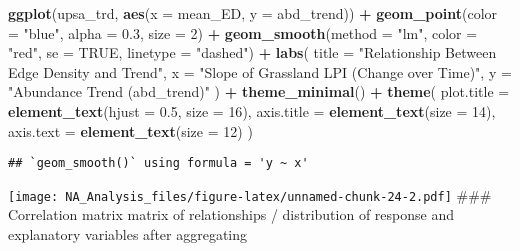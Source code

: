 \documentclass[
]{article}
\newenvironment{Shaded}{\begin{snugshade}}{\end{snugshade}}
\newcommand{\AttributeTok}[1]{\textcolor[rgb]{0.13,0.29,0.53}{#1}}
\newcommand{\ConstantTok}[1]{\textcolor[rgb]{0.56,0.35,0.01}{#1}}
\newcommand{\DecValTok}[1]{\textcolor[rgb]{0.00,0.00,0.81}{#1}}
\newcommand{\FloatTok}[1]{\textcolor[rgb]{0.00,0.00,0.81}{#1}}
\newcommand{\FunctionTok}[1]{\textcolor[rgb]{0.13,0.29,0.53}{\textbf{#1}}}
\newcommand{\NormalTok}[1]{#1}
\newcommand{\SpecialCharTok}[1]{\textcolor[rgb]{0.81,0.36,0.00}{\textbf{#1}}}
\newcommand{\StringTok}[1]{\textcolor[rgb]{0.31,0.60,0.02}{#1}}
\begin{document}
\begin{Shaded}
\begin{Highlighting}[]
\FunctionTok{ggplot}\NormalTok{(upsa\_trd, }\FunctionTok{aes}\NormalTok{(}\AttributeTok{x =}\NormalTok{ mean\_ED, }\AttributeTok{y =}\NormalTok{ abd\_trend)) }\SpecialCharTok{+}
  \FunctionTok{geom\_point}\NormalTok{(}\AttributeTok{color =} \StringTok{"blue"}\NormalTok{, }\AttributeTok{alpha =} \FloatTok{0.3}\NormalTok{, }\AttributeTok{size =} \DecValTok{2}\NormalTok{) }\SpecialCharTok{+}  
  \FunctionTok{geom\_smooth}\NormalTok{(}\AttributeTok{method =} \StringTok{"lm"}\NormalTok{, }\AttributeTok{color =} \StringTok{"red"}\NormalTok{, }\AttributeTok{se =} \ConstantTok{TRUE}\NormalTok{, }\AttributeTok{linetype =} \StringTok{"dashed"}\NormalTok{) }\SpecialCharTok{+} 
  \FunctionTok{labs}\NormalTok{(}
    \AttributeTok{title =} \StringTok{"Relationship Between Edge Density and Trend"}\NormalTok{,}
    \AttributeTok{x =} \StringTok{"Slope of Grassland LPI (Change over Time)"}\NormalTok{,}
    \AttributeTok{y =} \StringTok{"Abundance Trend (abd\_trend)"}
\NormalTok{  ) }\SpecialCharTok{+}
  \FunctionTok{theme\_minimal}\NormalTok{() }\SpecialCharTok{+}
  \FunctionTok{theme}\NormalTok{(}
    \AttributeTok{plot.title =} \FunctionTok{element\_text}\NormalTok{(}\AttributeTok{hjust =} \FloatTok{0.5}\NormalTok{, }\AttributeTok{size =} \DecValTok{16}\NormalTok{),}
    \AttributeTok{axis.title =} \FunctionTok{element\_text}\NormalTok{(}\AttributeTok{size =} \DecValTok{14}\NormalTok{),}
    \AttributeTok{axis.text =} \FunctionTok{element\_text}\NormalTok{(}\AttributeTok{size =} \DecValTok{12}\NormalTok{)}
\NormalTok{  )}
\end{Highlighting}
\end{Shaded}

\begin{verbatim}
## `geom_smooth()` using formula = 'y ~ x'
\end{verbatim}

\texttt{[image: NA\_Analysis\_files/figure-latex/unnamed-chunk-24-2.pdf]}
\#\#\# Correlation matrix matrix of relationships / distribution of
response and explanatory variables after aggregating
\end{document}

